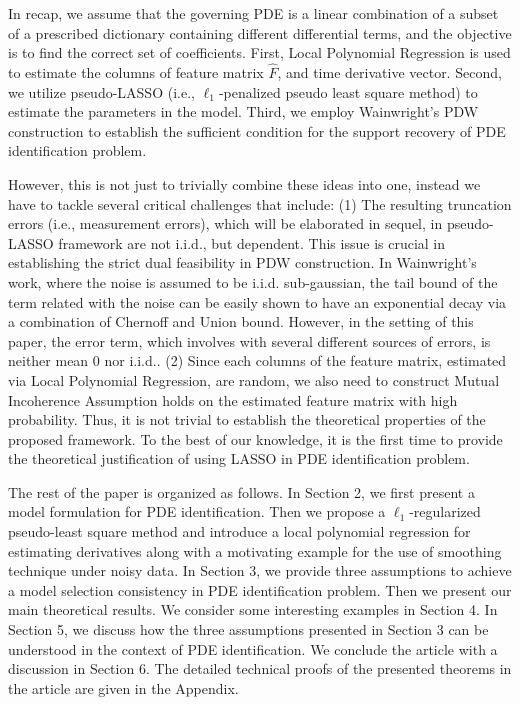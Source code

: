 \documentclass[a4paper,11pt]{article}
\begin{document}
In recap, we assume that the governing PDE is a linear combination of a subset of a prescribed dictionary containing different differential terms, and the objective is to find the correct set of coefficients. First, Local Polynomial Regression is used to estimate the columns of feature matrix $\widehat{F}$, and time derivative vector. Second, we utilize pseudo-LASSO (i.e., $\ell_{1}$-penalized pseudo least square method) to estimate the parameters in the model. Third, we employ Wainwright’s PDW construction to establish the sufficient condition for the support recovery of PDE identification problem. 

However, this is not just to trivially combine these ideas into one, instead we have to tackle several critical challenges that include: (1) The resulting truncation errors (i.e., measurement errors), which will be elaborated in sequel, in pseudo-LASSO framework are not i.i.d., but dependent. This issue is crucial in establishing the strict dual feasibility in PDW construction. In Wainwright’s work, where the noise is assumed to be i.i.d. sub-gaussian, the tail bound of the term related with the noise can be easily shown to have an exponential decay via a combination of Chernoff and Union bound. However, in the setting of this paper, the error term, which involves with several different sources of errors, is neither mean 0 nor i.i.d.. (2) Since each columns of the feature matrix, estimated via Local Polynomial Regression, are random, we also need to construct Mutual Incoherence Assumption holds on the estimated feature matrix with high probability. 
Thus, it is not trivial to establish the theoretical properties of the proposed framework. To the best of our knowledge, 
it is 
the first time to provide the theoretical justification of using LASSO in PDE identification problem.

The rest of the paper is organized as follows. In Section 2, we first present a model formulation for PDE identification. Then we propose a $\ell_{1}$-regularized pseudo-least square method and introduce a local polynomial regression for estimating derivatives along with a motivating example for the use of smoothing technique under noisy data. In Section 3, we provide three assumptions to achieve a model selection consistency in PDE identification problem. Then we present our main theoretical results. We consider some interesting examples in Section 4. In Section 5, we discuss how the three assumptions presented in Section 3 can be understood in the context of PDE identification. We conclude the article with a discussion in Section 6. The detailed technical proofs of the presented theorems in the article are given in the Appendix.
\end{document}
